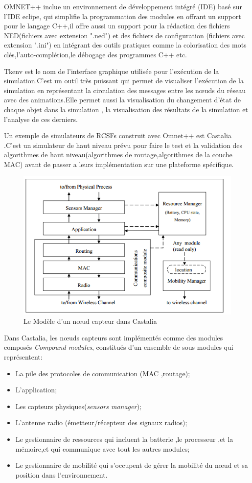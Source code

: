 OMNET++ inclue un environnement de développement intégré (IDE) basé sur l'IDE eclipe, qui simplifie  la programmation des modules en offrant un support pour le langage C++,il offre aussi un support pour la rédaction des fichiers NED(fichiers avec extension ".ned") et des fichiers de configuration (fichiers avec extension ".ini") en intégrant des outils pratiques comme la colorisation des mots clés,l'auto-complétion,le débogage des programmes C++ etc.

Tkenv est le nom de l'interface graphique utilisée pour l'exécution de la simulation.C'est un outil très puissant qui permet de visualiser  l'exécution de la simulation en représentant la circulation des messages entre les nœuds du réseau avec des animations.Elle permet aussi la visualisation du changement d'état de chaque objet dans la simulation , la visualisation des résultats de la simulation et l'analyse de ces derniers.

Un exemple de simulateurs de RCSFs construit avec Omnet++ est Castalia .C'est un simulateur de haut niveau prévu pour faire le test et la validation des algorithmes de haut niveau(algorithmes de routage,algorithmes de la couche MAC) avant de passer a leurs implémentation sur une plateforme spécifique.
\begin{figure}[!h]
\includegraphics[scale=0.8]{castaliaModel}
\caption{\label{castaliaModel}Le Modèle d'un nœud capteur dans Castalia}
\end{figure}
Dans Castalia, les nœuds capteurs sont implémentés comme des modules composés \emph{Compound modules}, constitués d'un ensemble de sous modules qui représentent:
\begin{itemize}
\item La pile des protocoles de communication (MAC ,routage);%
\item L'application;
\item Les capteurs physiques(\emph{sensors manager});
\item L'antenne radio (émetteur/récepteur des signaux radios);
\item Le gestionnaire de ressources qui incluent la batterie ,le processeur ,et la mémoire,et qui communique avec tout les autres modules;
\item Le gestionnaire de mobilité qui s'occupent de gérer la mobilité du nœud et sa position dans l'environnement.
\end{itemize}

